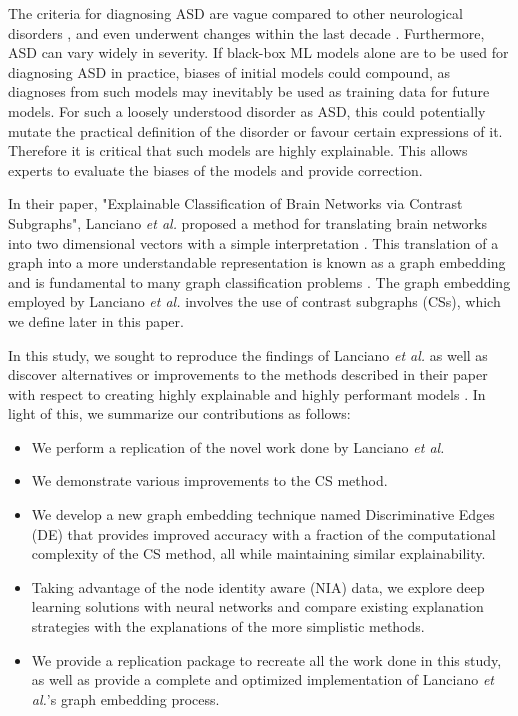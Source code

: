 \documentclass[sigconf]{acmart}
\begin{document}
The criteria for diagnosing ASD are vague compared to other neurological disorders \cite{dsm52013}, and even underwent changes within the last decade \cite{grant2013}.
Furthermore, ASD can vary widely in severity.
If black-box ML models alone are to be used for diagnosing ASD in practice, biases of initial models could compound, as diagnoses from such models may inevitably be used as training data for future models.
For such a loosely understood disorder as ASD, this could potentially mutate the practical definition of the disorder or favour certain expressions of it.
Therefore it is critical that such models are highly explainable.
This allows experts to evaluate the biases of the models and provide correction.

In their paper, "Explainable Classification of Brain Networks via Contrast Subgraphs", Lanciano \emph{et al.} proposed a method for translating brain networks into two dimensional vectors with a simple interpretation \cite{lanciano2020}.
This translation of a graph into a more understandable representation is known as a graph embedding and is fundamental to many graph classification problems \cite{goyal2018}.
The graph embedding employed by Lanciano \emph{et al.} involves the use of contrast subgraphs (CSs), which we define later in this paper.

In this study, we sought to reproduce the findings of Lanciano \emph{et al.} as well as discover alternatives or improvements to the methods described in their paper with respect to creating highly explainable and highly performant models \cite{lanciano2020}.
In light of this, we summarize our contributions as follows:

\begin{itemize}
    \item We perform a replication of the novel work done by Lanciano \emph{et al.}
    \item We demonstrate various improvements to the CS method.
    \item We develop a new graph embedding technique named Discriminative Edges (DE) that provides improved accuracy with a fraction of the computational complexity of the CS method, all while maintaining similar explainability.
    \item Taking advantage of the node identity aware (NIA) data, we explore deep learning solutions with neural networks and compare existing explanation strategies with the explanations of the more simplistic methods.
    \item We provide a replication package to recreate all the work done in this study, as well as provide a complete and optimized implementation of Lanciano \emph{et al.}'s graph embedding process.
\end{itemize}
\end{document}
